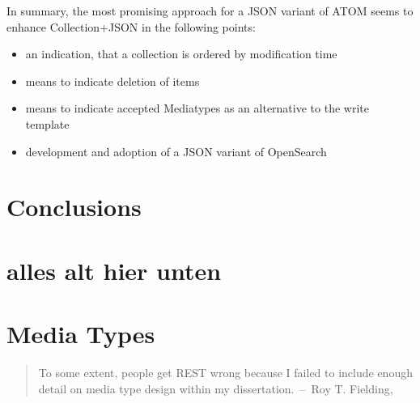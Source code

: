 \documentclass[12pt,a4paper,twoside]{scrartcl}		%
\begin{document}
In summary, the most promising approach for a JSON variant of ATOM seems to
enhance Collection+JSON in the following points:

\begin{itemize}
\item an indication, that a collection is ordered by modification time
\item means to indicate deletion of items
\item means to indicate accepted Mediatypes as an alternative to the write
  template
\item development and adoption of a JSON variant of OpenSearch
\end{itemize}


\section{Conclusions}
\label{sec:conclusions}



\section{alles alt hier unten}





\section{Media Types}


\begin{quote}
  To some extent, people get REST wrong because I failed to include enough
  detail on media type design within my dissertation.~--~Roy T. Fielding, \cite{Fielding2008}
\end{quote}
\end{document}
